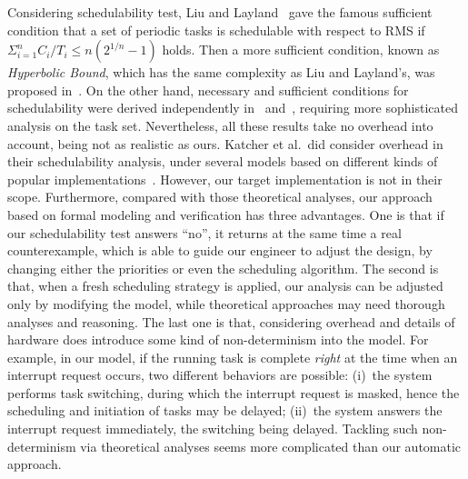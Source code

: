 \documentclass[12pt,onecolumn]{IEEEtranTIE}
\begin{document}
Considering schedulability test, Liu and
Layland~\cite{DBLP:journals/jacm/LiuL73} gave the famous sufficient
condition that a set of periodic tasks is schedulable with respect to
RMS if $\Sigma^n_{i=1} C_i/T_i \le n(2^{1/n}-1)$ holds. Then a more
sufficient condition, known as \emph{Hyperbolic Bound}, which has the
same complexity as Liu and Layland's, was proposed
in~\cite{DBLP:journals/tc/BiniBB03}. On the other hand, necessary and
sufficient conditions for schedulability were derived independently
in~\cite{DBLP:journals/rts/SpruntSL89} and~\cite{audsley1993deadline},
requiring more sophisticated analysis on the task set. Nevertheless,
all these results take no overhead into account, being not as
realistic as ours. Katcher et al.\ did consider overhead in their
schedulability analysis, under several models based on different kinds
of popular implementations~\cite{DBLP:journals/tse/KatcherAS93}.
However, our target implementation is not in their scope. Furthermore,
compared with those theoretical analyses, our approach based on formal
modeling and verification has three advantages. One is that if our
schedulability test answers ``no'', it returns at the same time a real
counterexample, which is able to guide our engineer to adjust the
design, by changing either the priorities or even the scheduling
algorithm. The second is that, when a fresh scheduling strategy is
applied, our analysis can be adjusted only by modifying the model,
while theoretical approaches may need thorough analyses and reasoning.
The last one is that, considering overhead and details of hardware
does introduce some kind of non-determinism into the model. For
example, in our model, if the running task is complete \emph{right} at
the time when an interrupt request occurs, two different behaviors are
possible: (i)~the system performs task switching, during which the
interrupt request is masked, hence the scheduling and initiation of
tasks may be delayed; (ii)~the system answers the interrupt request
immediately, the switching being delayed. Tackling such
non-determinism via theoretical analyses seems more complicated than
our automatic approach.
\end{document}
